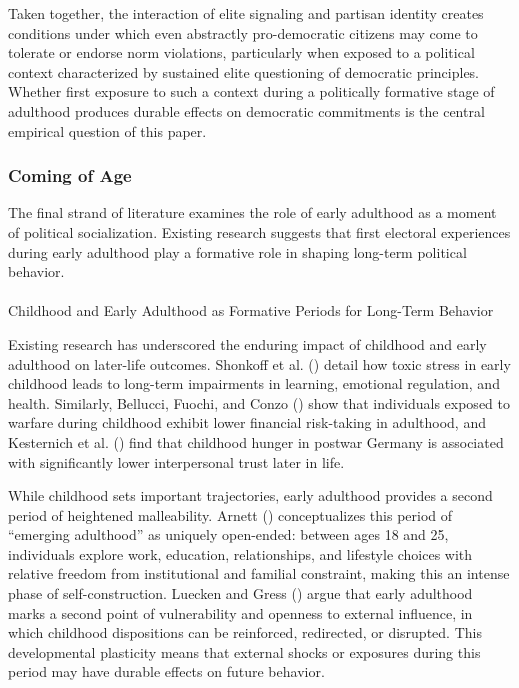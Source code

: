 \documentclass[
  10pt,
  letterpaper,
  DIV=11,
  numbers=noendperiod]{scrartcl}
\makeatletter
\let\oldparagraph\paragraph
\renewcommand{\paragraph}{
    \@ifstar
      \xxxParagraphStar
      \xxxParagraphNoStar
  }
\newcommand{\xxxParagraphStar}[1]{\oldparagraph*{#1}\mbox{}}
\newcommand{\xxxParagraphNoStar}[1]{\oldparagraph{#1}\mbox{}}
\makeatother
\begin{document}
Taken together, the interaction of elite signaling and partisan identity
creates conditions under which even abstractly pro-democratic citizens
may come to tolerate or endorse norm violations, particularly when
exposed to a political context characterized by sustained elite
questioning of democratic principles. Whether first exposure to such a
context during a politically formative stage of adulthood produces
durable effects on democratic commitments is the central empirical
question of this paper.

\subsubsection{Coming of Age}\label{coming-of-age}

The final strand of literature examines the role of early adulthood as a
moment of political socialization. Existing research suggests that first
electoral experiences during early adulthood play a formative role in
shaping long-term political behavior.

\paragraph{Childhood and Early Adulthood as Formative Periods for
Long-Term
Behavior}\label{childhood-and-early-adulthood-as-formative-periods-for-long-term-behavior}

Existing research has underscored the enduring impact of childhood and
early adulthood on later-life outcomes. Shonkoff et al.
() detail how toxic stress in early
childhood leads to long-term impairments in learning, emotional
regulation, and health. Similarly, Bellucci, Fuochi, and Conzo
() show that individuals exposed to
warfare during childhood exhibit lower financial risk-taking in
adulthood, and Kesternich et al. ()
find that childhood hunger in postwar Germany is associated with
significantly lower interpersonal trust later in life.

While childhood sets important trajectories, early adulthood provides a
second period of heightened malleability. Arnett
() conceptualizes this period of
``emerging adulthood'' as uniquely open-ended: between ages 18 and 25,
individuals explore work, education, relationships, and lifestyle
choices with relative freedom from institutional and familial
constraint, making this an intense phase of self-construction. Luecken
and Gress () argue that early adulthood
marks a second point of vulnerability and openness to external
influence, in which childhood dispositions can be reinforced,
redirected, or disrupted. This developmental plasticity means that
external shocks or exposures during this period may have durable effects
on future behavior.
\end{document}
